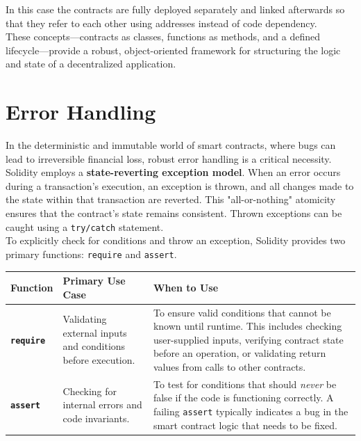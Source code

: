 \documentclass{scrbook}
\begin{document}
In this case the contracts are fully deployed separately and linked afterwards so that they refer to each other using addresses instead of code dependency.\\

These concepts—contracts as classes, functions as methods, and a defined lifecycle—provide a robust, object-oriented framework for structuring the logic and state of a decentralized application.

\chapter{Error Handling}

In the deterministic and immutable world of smart contracts, where bugs can lead to irreversible financial loss, robust error handling is a critical necessity. Solidity employs a \textbf{state-reverting exception model}. When an error occurs during a transaction's execution, an exception is thrown, and all changes made to the state within that transaction are reverted. This "all-or-nothing" atomicity ensures that the contract's state remains consistent. Thrown exceptions can be caught using a \texttt{try/catch} statement.\\

To explicitly check for conditions and throw an exception, Solidity provides two primary functions: \texttt{require} and \texttt{assert}.

\begin{table}[h!]
    \centering
    \begin{tabular}{|p{}|p{}|p{}|}
        \hline
        Function & Primary Use Case & When to Use \\ \hline
        
        \texttt{\textbf{require}} & Validating external inputs and conditions before execution. & To ensure valid conditions that cannot be known until runtime. This includes checking user-supplied inputs, verifying contract state before an operation, or validating return values from calls to other contracts. \\ \hline
        
        \texttt{\textbf{assert}} & Checking for internal errors and code invariants. & To test for conditions that should \textit{never} be false if the code is functioning correctly. A failing \texttt{assert} typically indicates a bug in the smart contract logic that needs to be fixed. \\ \hline
    \end{tabular}
\end{table}
\end{document}
